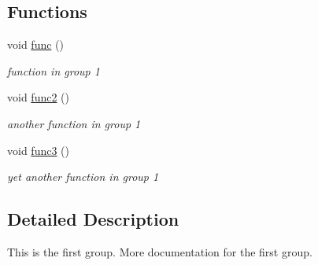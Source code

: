 \subsection*{Functions}
\begin{DoxyCompactItemize}
\item 
\hypertarget{group__group1_ga24f647174760cac13d2624b5ad74b00c}{void \hyperlink{group__group1_ga24f647174760cac13d2624b5ad74b00c}{func} ()}\label{group__group1_ga24f647174760cac13d2624b5ad74b00c}

\begin{DoxyCompactList}\small\item\em function in group 1 \end{DoxyCompactList}\item 
\hypertarget{group__group1_ga053929c0809a5f56f7548fd7d9968f31}{void \hyperlink{group__group1_ga053929c0809a5f56f7548fd7d9968f31}{func2} ()}\label{group__group1_ga053929c0809a5f56f7548fd7d9968f31}

\begin{DoxyCompactList}\small\item\em another function in group 1 \end{DoxyCompactList}\item 
\hypertarget{group__group1_gadbf675591ff057ec48ce35b0d5cdf755}{void \hyperlink{group__group1_gadbf675591ff057ec48ce35b0d5cdf755}{func3} ()}\label{group__group1_gadbf675591ff057ec48ce35b0d5cdf755}

\begin{DoxyCompactList}\small\item\em yet another function in group 1 \end{DoxyCompactList}\end{DoxyCompactItemize}


\subsection{Detailed Description}
This is the first group. More documentation for the first group.